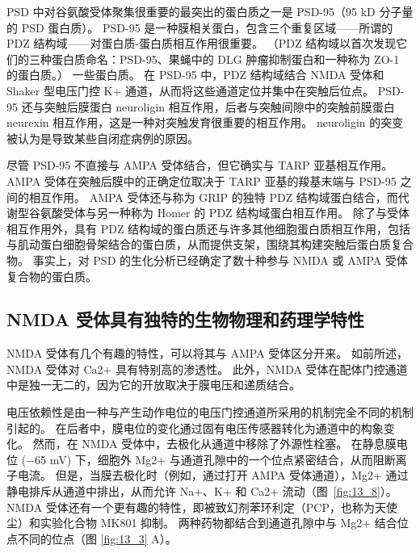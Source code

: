 PSD 中对谷氨酸受体聚集很重要的最突出的蛋白质之一是 PSD-95（95 kD 分子量的 PSD 蛋白质）。
PSD-95 是一种膜相关蛋白，包含三个重复区域——所谓的 PDZ 结构域——对蛋白质-蛋白质相互作用很重要。 （PDZ 结构域以首次发现它们的三种蛋白质命名：PSD-95、果蝇中的 DLG 肿瘤抑制蛋白和一种称为 ZO-1 的蛋白质。） 一些蛋白质。
在 PSD-95 中，PDZ 结构域结合 NMDA 受体和 Shaker 型电压门控 K+ 通道，从而将这些通道定位并集中在突触后位点。
PSD-95 还与突触后膜蛋白 neuroligin 相互作用，后者与突触间隙中的突触前膜蛋白 neurexin 相互作用，这是一种对突触发育很重要的相互作用。 neuroligin 的突变被认为是导致某些自闭症病例的原因。


尽管 PSD-95 不直接与 AMPA 受体结合，但它确实与 TARP 亚基相互作用。
AMPA 受体在突触后膜中的正确定位取决于 TARP 亚基的羧基末端与 PSD-95 之间的相互作用。
AMPA 受体还与称为 GRIP 的独特 PDZ 结构域蛋白结合，而代谢型谷氨酸受体与另一种称为 Homer 的 PDZ 结构域蛋白相互作用。
除了与受体相互作用外，具有 PDZ 结构域的蛋白质还与许多其他细胞蛋白质相互作用，包括与肌动蛋白细胞骨架结合的蛋白质，从而提供支架，围绕其构建突触后蛋白质复合物。
事实上，对 PSD 的生化分析已经确定了数十种参与 NMDA 或 AMPA 受体复合物的蛋白质。



\subsection{NMDA 受体具有独特的生物物理和药理学特性}

NMDA 受体有几个有趣的特性，可以将其与 AMPA 受体区分开来。
如前所述，NMDA 受体对 Ca2+ 具有特别高的渗透性。
此外，NMDA 受体在配体门控通道中是独一无二的，因为它的开放取决于膜电压和递质结合。


电压依赖性是由一种与产生动作电位的电压门控通道所采用的机制完全不同的机制引起的。
在后者中，膜电位的变化通过固有电压传感器转化为通道中的构象变化。
然而，在 NMDA 受体中，去极化从通道中移除了外源性栓塞。
在静息膜电位 (−65 mV) 下，细胞外 Mg2+ 与通道孔隙中的一个位点紧密结合，从而阻断离子电流。
但是，当膜去极化时（例如，通过打开 AMPA 受体通道），Mg2+ 通过静电排斥从通道中排出，从而允许 Na+、K+ 和 Ca2+ 流动（图~\ref{fig:13_8}）。 
NMDA 受体还有一个更有趣的特性，即被致幻剂苯环利定（PCP，也称为天使尘）和实验化合物 MK801 抑制。
两种药物都结合到通道孔隙中与 Mg2+ 结合位点不同的位点（图 \ref{fig:13_3} A）。


